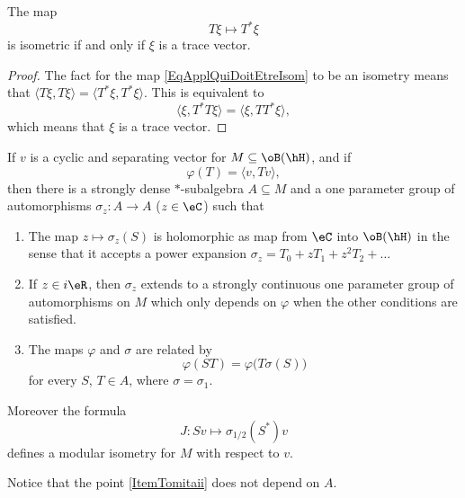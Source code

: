 \begin{lemma}
	The map
	\begin{equation}	\label{EqApplQuiDoitEtreIsom}
		T\xi\mapsto T^*\xi
	\end{equation}
	is isometric if and only if $\xi$ is a trace vector.
\end{lemma}

\begin{proof}
	The fact for the map \eqref{EqApplQuiDoitEtreIsom} to be an isometry means that $\langle T\xi, T\xi\rangle =\langle T^*\xi, T^*\xi\rangle $. This is equivalent to
	\begin{equation}
		\langle \xi, T^*T\xi\rangle =\langle \xi, TT^*\xi\rangle ,
	\end{equation}
	which means that $\xi$ is a trace vector.
\end{proof}

\begin{theorem}
	If $v$ is a cyclic and separating vector for $M\subseteq\oB(\hH)$, and if
	\begin{equation}
		\varphi(T)=\langle v, Tv\rangle ,
	\end{equation}
	then there is a strongly dense $*$-subalgebra $A\subseteq M$ and a one parameter group of automorphisms $\sigma_z\colon A\to A$ ($z\in\eC$) such that
	\begin{enumerate}
	\item The map $z\mapsto \sigma_z(S)$ is holomorphic as map from $\eC$ into $\oB(\hH)$ in the sense that it accepts a power expansion $\sigma_z=T_0+zT_1+z^2T_2+\ldots$
	\item\label{ItemTomitaii} If $z\in i\eR$, then $\sigma_z$ extends to a strongly continuous one parameter group of automorphisms on $M$ which only depends on $\varphi$ when the other conditions are satisfied.
	\item The maps $\varphi$ and $\sigma$ are related by
	\begin{equation}
		\varphi(ST)=\varphi\big( T\sigma(S) \big)
	\end{equation}
	for every $S$, $T\in A$, where $\sigma=\sigma_1$.
	\end{enumerate}
	Moreover the formula
	\begin{equation}
		J\colon Sv\mapsto \sigma_{1/2}(S^*)v
	\end{equation}
	defines a modular isometry for $M$ with respect to $v$.
\end{theorem}
Notice that the point \ref{ItemTomitaii} does not depend on $A$.

